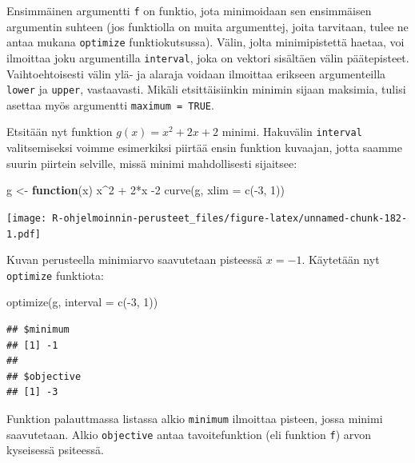 \documentclass[
]{book}
\newenvironment{Shaded}{\begin{snugshade}}{\end{snugshade}}
\newcommand{\AttributeTok}[1]{\textcolor[rgb]{0.77,0.63,0.00}{#1}}
\newcommand{\ControlFlowTok}[1]{\textcolor[rgb]{0.13,0.29,0.53}{\textbf{#1}}}
\newcommand{\DecValTok}[1]{\textcolor[rgb]{0.00,0.00,0.81}{#1}}
\newcommand{\FunctionTok}[1]{\textcolor[rgb]{0.00,0.00,0.00}{#1}}
\newcommand{\NormalTok}[1]{#1}
\newcommand{\OtherTok}[1]{\textcolor[rgb]{0.56,0.35,0.01}{#1}}
\newcommand{\SpecialCharTok}[1]{\textcolor[rgb]{0.00,0.00,0.00}{#1}}
\begin{document}
Ensimmäinen argumentti \texttt{f} on funktio, jota minimoidaan sen ensimmäisen argumentin suhteen (jos funktiolla on muita argumenttej, joita tarvitaan, tulee ne antaa mukana \texttt{optimize} funktiokutsussa). Välin, jolta minimipistettä haetaa, voi ilmoittaa joku argumentilla \texttt{interval}, joka on vektori sisältäen välin päätepisteet. Vaihtoehtoisesti välin ylä- ja alaraja voidaan ilmoittaa erikseen argumenteilla \texttt{lower} ja \texttt{upper}, vastaavasti. Mikäli etsittäisiinkin minimin sijaan maksimia, tulisi asettaa myös argumentti \texttt{maximum\ =\ TRUE}.

Etsitään nyt funktion \(g(x) = x^2 + 2x + 2\) minimi. Hakuvälin \texttt{interval} valitsemiseksi voimme esimerkiksi piirtää ensin funktion kuvaajan, jotta saamme suurin piirtein selville, missä minimi mahdollisesti sijaitsee:

\begin{Shaded}
\begin{Highlighting}[]
\NormalTok{g }\OtherTok{\textless{}{-}} \ControlFlowTok{function}\NormalTok{(x) x}\SpecialCharTok{\^{}}\DecValTok{2} \SpecialCharTok{+} \DecValTok{2}\SpecialCharTok{*}\NormalTok{x }\SpecialCharTok{{-}}\DecValTok{2}
\FunctionTok{curve}\NormalTok{(g, }\AttributeTok{xlim =} \FunctionTok{c}\NormalTok{(}\SpecialCharTok{{-}}\DecValTok{3}\NormalTok{, }\DecValTok{1}\NormalTok{))}
\end{Highlighting}
\end{Shaded}

\texttt{[image: R-ohjelmoinnin-perusteet\_files/figure-latex/unnamed-chunk-182-1.pdf]}

Kuvan perusteella minimiarvo saavutetaan pisteessä \(x = -1\). Käytetään nyt \texttt{optimize} funktiota:

\begin{Shaded}
\begin{Highlighting}[]
\FunctionTok{optimize}\NormalTok{(g, }\AttributeTok{interval =} \FunctionTok{c}\NormalTok{(}\SpecialCharTok{{-}}\DecValTok{3}\NormalTok{, }\DecValTok{1}\NormalTok{))}
\end{Highlighting}
\end{Shaded}

\begin{verbatim}
## $minimum
## [1] -1
## 
## $objective
## [1] -3
\end{verbatim}

Funktion palauttmassa listassa alkio \texttt{minimum} ilmoittaa pisteen, jossa minimi saavutetaan. Alkio \texttt{objective} antaa tavoitefunktion (eli funktion \texttt{f}) arvon kyseisessä psiteessä.
\end{document}
